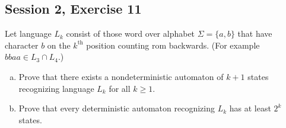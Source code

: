 \subsection{Session 2, Exercise 11}


Let language $L_k$ consist of those word over alphabet $\Sigma=\{a,b\}$ that have character $b$ on the $k^{\text{th}}$ position counting rom backwards. (For example $bbaa\in{}L_3\cap{}L_4$.)

\begin{enumerate}[a.)]
    \item Prove that there exists a nondeterministic automaton of $k+1$ states recognizing language $L_k$ for all $k\geq{}1$.
    \item Prove that every deterministic automaton recognizing $L_k$ has at least $2^k$ states.
\end{enumerate}

